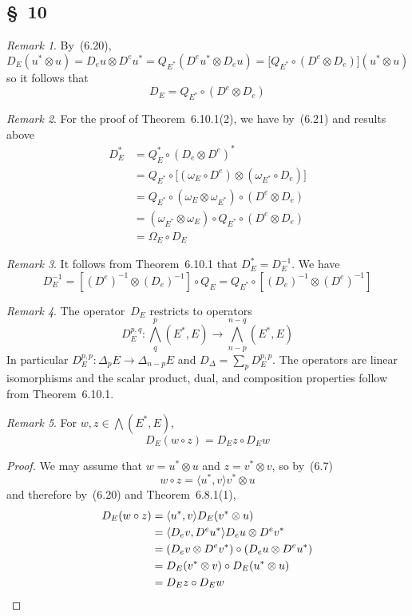 \documentclass[letterpaper,12pt]{article}
\newcommand{\after}{\circ}
\newcommand{\tprod}{\otimes}
\newcommand{\bigeprod}{\bigwedge}
\newcommand{\medeprod}{{\textstyle\bigeprod}}
\newcommand{\sprod}[2]{\langle#1,#2\rangle}
\theoremstyle{definition}
\theoremstyle{remark}
\newtheorem*{rmk}{Remark}
\begin{document}
\subsection*{\S~10}
\begin{rmk}
By~(6.20),
\[D_E(u^*\tprod u)=D_e u\tprod D^e u^*=Q_{E^*}(D^e u^*\tprod D_e u)=\bigl[Q_{E^*}\after(D^e\tprod D_e)\bigr](u^*\tprod u)\]
so it follows that
\[D_E=Q_{E^*}\after(D^e\tprod D_e)\]
\end{rmk}

\begin{rmk}
For the proof of Theorem~6.10.1(2), we have by~(6.21) and results above
\begin{align*}
D_E^*&=Q_E^*\after(D_e\tprod D^e)^*\\
	&=Q_{E^*}\after\bigl[(\omega_E\after D^e)\tprod(\omega_{E^*}\after D_e)\bigr]\\
	&=Q_{E^*}\after(\omega_E\tprod\omega_{E^*})\after(D^e\tprod D_e)\\
	&=(\omega_{E^*}\tprod\omega_E)\after Q_{E^*}\after(D^e\tprod D_e)\\
	&=\Omega_E\after D_E
\end{align*}
\end{rmk}

\begin{rmk}
It follows from Theorem~6.10.1 that \(D_E^*=D_E^{-1}\). We have
\[D_E^{-1}=[(D^e)^{-1}\tprod(D_e)^{-1}]\after Q_E=Q_{E^*}\after[(D_e)^{-1}\tprod(D^e)^{-1}]\]
\end{rmk}

\begin{rmk}
The operator~\(D_E\) restricts to operators
\[D_E^{p,q}:\medeprod^p_q(E^*,E)\to\medeprod^{n-q}_{n-p}(E^*,E)\]
In particular \(D_E^{p,p}:\Delta_p E\to\Delta_{n-p}E\) and \(D_{\Delta}=\sum_p D_E^{p,p}\). The operators are linear isomorphisms and the scalar product, dual, and composition properties follow from Theorem~6.10.1.
\end{rmk}

\begin{rmk}
For \(w,z\in\medeprod(E^*,E)\),
\[D_E(w\after z)=D_Ez\after D_Ew\]
\end{rmk}
\begin{proof}
We may assume that \(w=u^*\tprod u\) and \(z=v^*\tprod v\), so by~(6.7)
\[w\after z=\sprod{u^*}{v}v^*\tprod u\]
and therefore by~(6.20) and Theorem~6.8.1(1),
\begin{align*}
D_E(w\after z)&=\sprod{u^*}{v}D_E(v^*\tprod u)\\
	&=\sprod{D_e v}{D^e u^*}D_e u\tprod D^e v^*\\
	&=(D_e v\tprod D^e v^*)\after(D_e u\tprod D^e u^*)\\
	&=D_E(v^*\tprod v)\after D_E(u^*\tprod u)\\
	&=D_Ez\after D_Ew\qedhere
\end{align*}
\end{proof}
\end{document}
